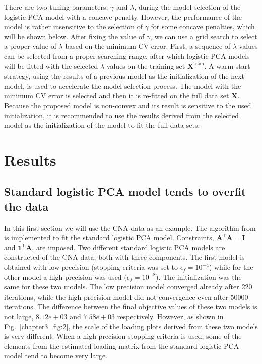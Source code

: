 There are two tuning parameters, $\gamma$ and $\lambda$, during the model selection of the logistic PCA model with a concave penalty. However, the performance of the model is rather insensitive to the selection of $\gamma$ for some concave penalties, which will be shown below. After fixing the value of $\gamma$, we can use a grid search to select a proper value of $\lambda$ based on the minimum CV error. First, a sequence of $\lambda$ values can be selected from a proper searching range, after which logistic PCA models will be fitted with the selected $\lambda$ values on the training set $\mathbf{X}^{\text{train}}$. A warm start strategy, using the results of a previous model as the initialization of the next model, is used to accelerate the model selection process. The model with the minimum CV error is selected and then it is re-fitted on the full data set $\mathbf{X}$. Because the proposed model is non-convex and its result is sensitive to the used initialization, it is recommended to use the results derived from the selected model as the initialization of the model to fit the full data sets.

\section{Results}
\subsection{Standard logistic PCA model tends to overfit the data}
In this first section we will use the CNA data as an example. The algorithm from \cite{de2006principal} is implemented to fit the standard logistic PCA model. Constraints, $\mathbf{A}^{\text{T}}\mathbf{A} = \mathbf{I}$ and $\mathbf{1}^{\text{T}}\mathbf{A}$, are imposed. Two different standard logistic PCA models  are constructed of the CNA data, both with three components. The first model is obtained with low precision (stopping criteria was set to $\epsilon_f=10^{-4}$) while for the other model a high precision was used ($\epsilon_f=10^{-8}$). The initialization was the same for these two models. The low precision model converged already after 220 iterations, while the high precision model did not convergence even after 50000 iterations. The difference between the final objective values of these two models is not large, $8.12e+03$ and $7.58e+03$ respectively. However, as shown in Fig.~\ref{chapter3_fig:2}, the scale of the loading plots derived from these two models is very different. When a high precision stopping criteria is used, some of the elements from the estimated loading matrix from the standard logistic PCA model tend to become very large.

